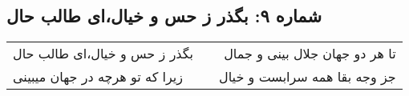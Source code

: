 \begin{center}
\section*{شماره ۹: بگذر ز حس و خیال،‌ای طالب حال}
\label{sec:009}
\begin{longtable}{l p{0.5cm} r}
بگذر ز حس و خیال،‌ای طالب حال
&&
تا هر دو جهان جلال بینی و جمال
\\
زیرا که تو هرچه در جهان میبینی
&&
جز وجه بقا همه سرابست و خیال
\\
\end{longtable}
\end{center}
